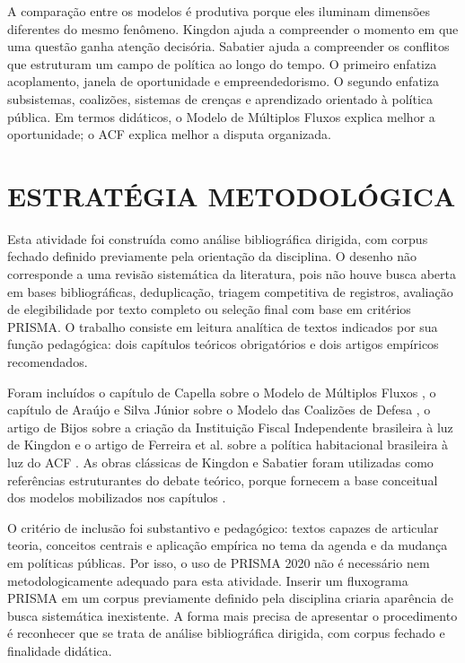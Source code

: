 \documentclass[12pt,a4paper]{article}
\begin{document}
A comparação entre os modelos é produtiva porque eles iluminam dimensões diferentes do mesmo fenômeno. Kingdon ajuda a compreender o momento em que uma questão ganha atenção decisória. Sabatier ajuda a compreender os conflitos que estruturam um campo de política ao longo do tempo. O primeiro enfatiza acoplamento, janela de oportunidade e empreendedorismo. O segundo enfatiza subsistemas, coalizões, sistemas de crenças e aprendizado orientado à política pública. Em termos didáticos, o Modelo de Múltiplos Fluxos explica melhor a oportunidade; o ACF explica melhor a disputa organizada.

\section{ESTRATÉGIA METODOLÓGICA}
\label{sec:org1d9f326}
Esta atividade foi construída como análise bibliográfica dirigida, com corpus fechado definido previamente pela orientação da disciplina. O desenho não corresponde a uma revisão sistemática da literatura, pois não houve busca aberta em bases bibliográficas, deduplicação, triagem competitiva de registros, avaliação de elegibilidade por texto completo ou seleção final com base em critérios PRISMA. O trabalho consiste em leitura analítica de textos indicados por sua função pedagógica: dois capítulos teóricos obrigatórios e dois artigos empíricos recomendados.

Foram incluídos o capítulo de Capella sobre o Modelo de Múltiplos Fluxos \autocite{capella2022multiplos}, o capítulo de Araújo e Silva Júnior sobre o Modelo das Coalizões de Defesa \autocite{araujoSilva2022coalizoes}, o artigo de Bijos sobre a criação da Instituição Fiscal Independente brasileira à luz de Kingdon \autocite{bijos2024ifi} e o artigo de Ferreira et al. sobre a política habitacional brasileira à luz do ACF \autocite{ferreira2019habitacional}. As obras clássicas de Kingdon e Sabatier foram utilizadas como referências estruturantes do debate teórico, porque fornecem a base conceitual dos modelos mobilizados nos capítulos \autocites{kingdon2003agendas}[][]{sabatier1999theories}.

O critério de inclusão foi substantivo e pedagógico: textos capazes de articular teoria, conceitos centrais e aplicação empírica no tema da agenda e da mudança em políticas públicas. Por isso, o uso de PRISMA 2020 não é necessário nem metodologicamente adequado para esta atividade. Inserir um fluxograma PRISMA em um corpus previamente definido pela disciplina criaria aparência de busca sistemática inexistente. A forma mais precisa de apresentar o procedimento é reconhecer que se trata de análise bibliográfica dirigida, com corpus fechado e finalidade didática.
\end{document}
